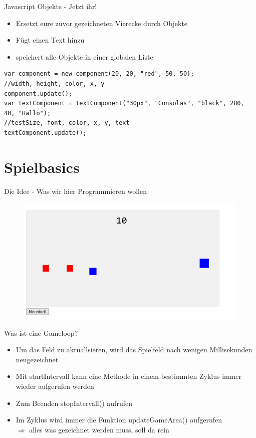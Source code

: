 \documentclass[18pt]{beamer}
\begin{document}
\begin{frame}[fragile]{Javascript Objekte - Jetzt ihr!}
\begin{itemize}
	\item Ersetzt eure zuvor gezeichneten Vierecke durch Objekte
	\item Fügt einen Text hinzu
	\item speichert alle Objekte in einer globalen Liste
	

\end{itemize}
\begin{lstlisting}
var component = new component(20, 20, "red", 50, 50);
//width, height, color, x, y
component.update();
var textComponent = textComponent("30px", "Consolas", "black", 280, 40, "Hallo");
//testSize, font, color, x, y, text
textComponent.update();
\end{lstlisting}
\end{frame}



\section{Spielbasics}

\begin{frame}{Die Idee - Was wir hier Programmieren wollen}
\begin{figure}[htb]
	\centering
	\includegraphics[width=1\textwidth]{logos/game}
\end{figure}
\end{frame}

\begin{frame}{Was ist eine Gameloop?}
\begin{itemize}
	\item Um das Feld zu aktuallsieren, wird das Spielfeld nach wenigen Millisekunden neugezeichnet
	\item Mit startIntervall kann eine Methode in einem bestimmten Zyklus immer wieder aufgerufen werden 
	\item Zum Beenden stopIntervall() aufrufen
	\item Im Zyklus wird immer die Funktion updateGameArea() aufgerufen\\ \( \Rightarrow \) alles was gezeichnet werden muss, soll da rein
\end{itemize}
\end{frame}
\end{document}
